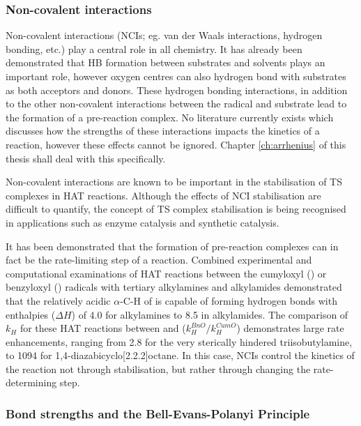 \subsubsection{Non-covalent interactions}

Non-covalent interactions (NCIs; eg. van der Waals interactions, hydrogen
bonding, etc.)  play a central role in all chemistry. It has already been
demonstrated that HB formation between substrates and solvents plays an
important role, however oxygen centres can also hydrogen bond with substrates as
both acceptors and donors.\cite{Johnson2009a} These hydrogen bonding
interactions, in addition to the other non-covalent interactions between the
radical and substrate lead to the formation of a pre-reaction complex. No
literature currently exists which discusses how the strengths of these
interactions impacts the kinetics of a reaction, however these effects cannot be
ignored. Chapter \ref{ch:arrhenius} of this thesis shall deal with this specifically.

Non-covalent interactions are known to be important in the stabilisation of TS
complexes in HAT reactions.\cite{DiLabio2005,DiLabio2007} Although the effects
of NCI stabilisation are difficult to quantify, the concept of TS complex
stabilisation is being recognised in applications such as enzyme
catalysis\cite{Uyeda2011} and synthetic catalysis.\cite{Bakr2016}

It has been demonstrated that the formation of pre-reaction complexes can in
fact be the rate-limiting step of a
reaction.\cite{Salamone2011,Salamone2011a,Salamone2013a} Combined experimental
and computational examinations of HAT reactions between the cumyloxyl (\cumo) or
benzyloxyl (\bno) radicals with tertiary alkylamines and alkylamides
demonstrated that the relatively acidic $\alpha$-C-H of \bno is capable of
forming hydrogen bonds with enthalpies ($\Delta H$) of 4.0 \kcalmol for
alkylamines to 8.5 \kcalmol in alkylamides. The comparison of $k_H$ for these
HAT reactions between \cumo and \bno ($k_H^{BnO}/k_H^{CumO}$) demonstrates large
rate enhancements, ranging from 2.8 for the very sterically hindered
triisobutylamine, to 1094 for 1,4-diazabicyclo[2.2.2]octane. In this case, NCIs
control the kinetics of the reaction not through stabilisation, but rather
through changing the rate-determining step.


\subsubsection{Bond strengths and the Bell-Evans-Polanyi Principle}

